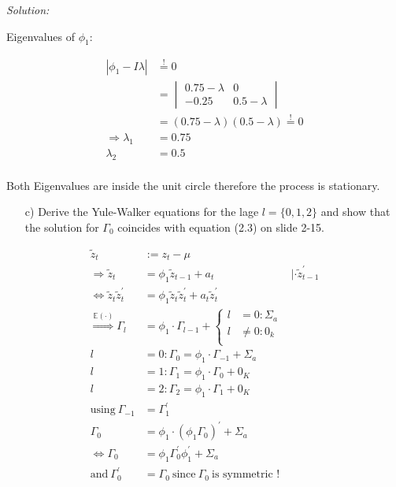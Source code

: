 \documentclass[12pt,a4paper]{article}
\begin{document}
\emph{Solution:}

Eigenvalues of \(\phi_1:\)

\begin{align*}
  \left| \phi_1 - I \lambda \right| & \overset{!}{=} 0 \\
  & = \begin{vmatrix}
  0.75 - \lambda & 0 \\
  -0.25 & 0.5 - \lambda 
  \end{vmatrix}\\
  & = (0.75 - \lambda)(0.5 - \lambda) \overset{!}{=}  0 \\
  \Rightarrow \lambda_1 & = 0.75 \\
  \lambda_2 & = 0.5\\
\end{align*}

Both Eigenvalues are inside the unit circle therefore the process is
stationary.

\begin{itemize}
    \item[c)] Derive the Yule-Walker equations for the lage $l = \{0,1,2 \}$ and show that the solution for $\Gamma_0$ coincides with equation (2.3) on slide 2-15.
\end{itemize}

\begin{align*}
  \tilde{z}_t & := z_t - \mu \\
  \Rightarrow \tilde{z}_t & =  \phi_1 \tilde{z}_{t-1} + a_t \qquad & | \cdot \tilde{z}_{t-1}^{'}   \\
  \Leftrightarrow \tilde{z}_t \tilde{z}_t^{'} & = \phi_1 \tilde{z}_t \tilde{z}_t^{'} + a_t \tilde{z}_t^{'}\\
  \overset{\mathbb{E} (\cdot)}{\Rightarrow} \Gamma_l & = \phi_1 \cdot \Gamma_{l- 1} + \begin{cases} 
  l & = 0: \Sigma_a \\
  l & \neq 0: 0_k\\
  \end{cases}\\
  l & = 0: \Gamma_0 = \phi_1 \cdot \Gamma_{-1} + \Sigma_a\\
  l & = 1: \Gamma_1 = \phi_1 \cdot \Gamma_{0} + 0_K \\
  l & = 2: \Gamma_2 = \phi_1 \cdot \Gamma_{1} + 0_K \\
  \text{using} \ \Gamma_{-1} & = \Gamma_{1}^{'}\\ 
  \Gamma_0 & = \phi_1 \cdot \left( \phi_1 \Gamma_0 \right)^{'} + \Sigma_a\\
  \Leftrightarrow \Gamma_0 & = \phi_1 \Gamma_0^{'} \phi_1^{'}  + \Sigma_a\\
   \text{and} \ \Gamma_0^{'} & = \Gamma_0 \ \text{since}  \ \Gamma_0 \ \text{is symmetric !}
\end{align*}
\end{document}
